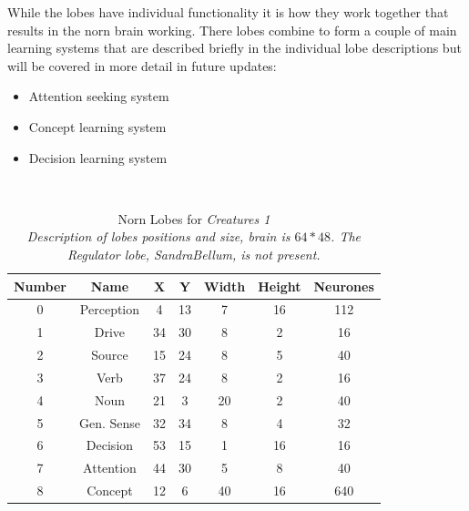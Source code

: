 \documentclass[11pt,twoside,a4paper]{article}
\begin{document}
While the lobes have individual functionality it is how they work together that results in the norn brain working. There lobes combine to form a couple of main learning systems that are described briefly in the individual lobe descriptions but will be covered in more detail in future updates:
\begin{itemize}
	\item Attention seeking system
	\item Concept learning system
	\item Decision learning system
\end{itemize}~\\

	\begin{table}[ht]
		\begin{center} \begin{scriptsize}
		\begin{tabular}{|c|c|c|c|c|c|c|}
			\hline
		\rowcolor[gray]{0.75} 
		Number	&	Name	&	X	&	Y	&	Width	&	Height	&	Neurones \\ \hline
		0	&	Perception	&	4	&	13	&	7		&	16		&	112 \\ \hline
		1	&	Drive		&	34	&	30	&	8		&	2		&	16 \\ \hline
		2	&	Source		&	15	&	24	&	8		&	5		&	40 \\ \hline
		3	&	Verb		&	37	&	24	&	8		&	2		&	16 \\ \hline
		4	&	Noun		&	21	&	3	&	20		&	2		&	40 \\ \hline
		5	&	Gen. Sense	&	32	&	34	&	8		&	4		&	32 \\ \hline
		6	&	Decision	&	53	&	15	&	1		&	16		&	16 \\ \hline
		7	&	Attention	&	44	&	30	&	5		&	8		&	40 \\ \hline
		8	&	Concept		&	12	&	6	&	40		&	16		&	640 \\ \hline
		\end{tabular}
		\caption[Norn Lobes for \emph{Creatures 1}]{Norn Lobes for \emph{Creatures 1} \\ \emph{Description of lobes positions and size,  brain is $64*48$. The Regulator lobe, \textnormal{SandraBellum}, is not present. } } %
		\end{scriptsize} \end{center}
		\label{tab:nornsLobesPositionsCreatures1}
	\end{table}
\end{document}
